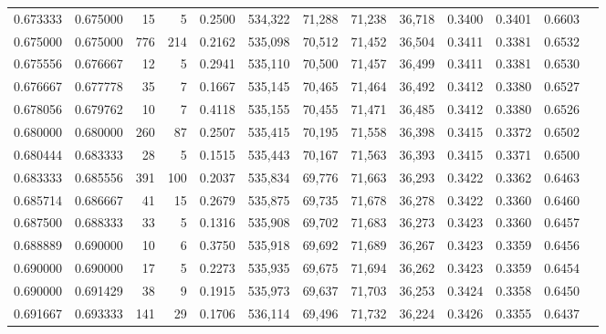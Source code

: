 \begin{tabular}{rrrrrrrrrrrrr}
0.673333 & 0.675000 &     15 &      5 &                                     0.2500 & 534,322 &  71,288 &  71,238 &  36,718 & 0.3400 & 0.3401 & 0.6603 \\
0.675000 & 0.675000 &    776 &    214 &                                     0.2162 & 535,098 &  70,512 &  71,452 &  36,504 & 0.3411 & 0.3381 & 0.6532 \\
0.675556 & 0.676667 &     12 &      5 &                                     0.2941 & 535,110 &  70,500 &  71,457 &  36,499 & 0.3411 & 0.3381 & 0.6530 \\
0.676667 & 0.677778 &     35 &      7 &                                     0.1667 & 535,145 &  70,465 &  71,464 &  36,492 & 0.3412 & 0.3380 & 0.6527 \\
0.678056 & 0.679762 &     10 &      7 &                                     0.4118 & 535,155 &  70,455 &  71,471 &  36,485 & 0.3412 & 0.3380 & 0.6526 \\
0.680000 & 0.680000 &    260 &     87 &                                     0.2507 & 535,415 &  70,195 &  71,558 &  36,398 & 0.3415 & 0.3372 & 0.6502 \\
0.680444 & 0.683333 &     28 &      5 &                                     0.1515 & 535,443 &  70,167 &  71,563 &  36,393 & 0.3415 & 0.3371 & 0.6500 \\
0.683333 & 0.685556 &    391 &    100 &                                     0.2037 & 535,834 &  69,776 &  71,663 &  36,293 & 0.3422 & 0.3362 & 0.6463 \\
0.685714 & 0.686667 &     41 &     15 &                                     0.2679 & 535,875 &  69,735 &  71,678 &  36,278 & 0.3422 & 0.3360 & 0.6460 \\
0.687500 & 0.688333 &     33 &      5 &                                     0.1316 & 535,908 &  69,702 &  71,683 &  36,273 & 0.3423 & 0.3360 & 0.6457 \\
0.688889 & 0.690000 &     10 &      6 &                                     0.3750 & 535,918 &  69,692 &  71,689 &  36,267 & 0.3423 & 0.3359 & 0.6456 \\
0.690000 & 0.690000 &     17 &      5 &                                     0.2273 & 535,935 &  69,675 &  71,694 &  36,262 & 0.3423 & 0.3359 & 0.6454 \\
0.690000 & 0.691429 &     38 &      9 &                                     0.1915 & 535,973 &  69,637 &  71,703 &  36,253 & 0.3424 & 0.3358 & 0.6450 \\
0.691667 & 0.693333 &    141 &     29 &                                     0.1706 & 536,114 &  69,496 &  71,732 &  36,224 & 0.3426 & 0.3355 & 0.6437 \\

\end{tabular}
